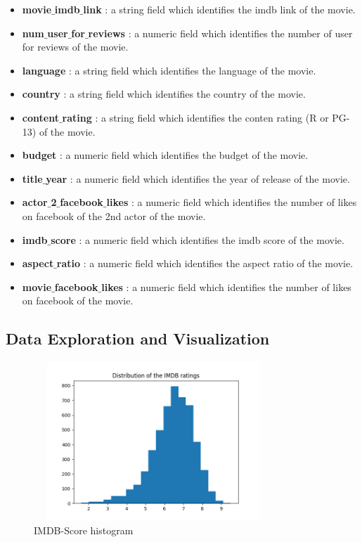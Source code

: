 \documentclass[conference]{IEEEtran}
\begin{document}
\begin{itemize}
	\item \textbf{movie$\_$imdb$\_$link} : a string field which identifies the imdb link of the movie. 
	\item \textbf{num$\_$user$\_$for$\_$reviews} : a numeric field which identifies the number of user for reviews of the movie. 
	\item \textbf{language}  : a string field which identifies the language of the movie.
	\item \textbf{country}  : a string field which identifies the country of the movie.
	\item \textbf{content$\_$rating} : a string field which identifies the conten rating (R or PG-13) of the movie.
	\item \textbf{budget} : a numeric field which identifies the budget of the movie.
	\item \textbf{title$\_$year} : a numeric field which identifies the year of release of the movie. 
	\item \textbf{actor$\_$2$\_$facebook$\_$likes} : a numeric field which identifies the number of likes on facebook of the 2nd actor of the movie.
	\item \textbf{imdb$\_$score} : a numeric field which identifies the imdb score of the movie.
	\item \textbf{aspect$\_$ratio}  : a numeric field which identifies the aspect ratio of the movie. 
	\item \textbf{movie$\_$facebook$\_$likes}  : a numeric field which identifies the number of likes on facebook of the movie.\\
\end{itemize}
\subsection{Data Exploration and Visualization}


\begin{figure}[H]
  \centering	
  \captionsetup{justification=centering}
  \includegraphics[height=6cm, width=9cm, trim={0mm 0mm 0mm 0mm},clip]{../visualizations/IMDB-Score-Histogram}
  \caption{IMDB-Score histogram}
  \label{fig:fig1}
\end{figure}
\end{document}
